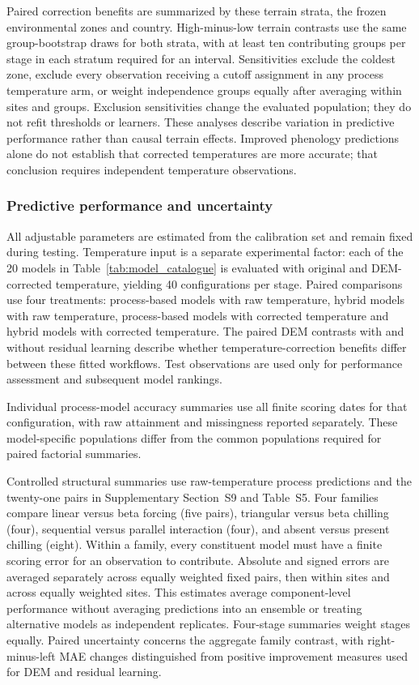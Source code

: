 \documentclass[a4paper,12pt]{article}
\let\OriginalSubsubsection\subsubsection
\renewcommand{\subsubsection}{\FloatBarrier\OriginalSubsubsection}
\begin{document}
Paired correction benefits are summarized by these terrain strata, the frozen environmental zones and country. High-minus-low terrain contrasts use the same group-bootstrap draws for both strata, with at least ten contributing groups per stage in each stratum required for an interval. Sensitivities exclude the coldest zone, exclude every observation receiving a cutoff assignment in any process temperature arm, or weight independence groups equally after averaging within sites and groups. Exclusion sensitivities change the evaluated population; they do not refit thresholds or learners. These analyses describe variation in predictive performance rather than causal terrain effects. Improved phenology predictions alone do not establish that corrected temperatures are more accurate; that conclusion requires independent temperature observations.

\subsubsection{Predictive performance and uncertainty}

All adjustable parameters are estimated from the calibration set and remain fixed during testing. Temperature input is a separate experimental factor: each of the 20 models in Table~\ref{tab:model_catalogue} is evaluated with original and DEM-corrected temperature, yielding 40 configurations per stage. Paired comparisons use four treatments: process-based models with raw temperature, hybrid models with raw temperature, process-based models with corrected temperature and hybrid models with corrected temperature. The paired DEM contrasts with and without residual learning describe whether temperature-correction benefits differ between these fitted workflows. Test observations are used only for performance assessment and subsequent model rankings.

Individual process-model accuracy summaries use all finite scoring dates for that configuration, with raw attainment and missingness reported separately. These model-specific populations differ from the common populations required for paired factorial summaries.

Controlled structural summaries use raw-temperature process predictions and the twenty-one pairs in Supplementary Section~S9 and Table~S5. Four families compare linear versus beta forcing (five pairs), triangular versus beta chilling (four), sequential versus parallel interaction (four), and absent versus present chilling (eight). Within a family, every constituent model must have a finite scoring error for an observation to contribute. Absolute and signed errors are averaged separately across equally weighted fixed pairs, then within sites and across equally weighted sites. This estimates average component-level performance without averaging predictions into an ensemble or treating alternative models as independent replicates. Four-stage summaries weight stages equally. Paired uncertainty concerns the aggregate family contrast, with right-minus-left MAE changes distinguished from positive improvement measures used for DEM and residual learning.
\end{document}
